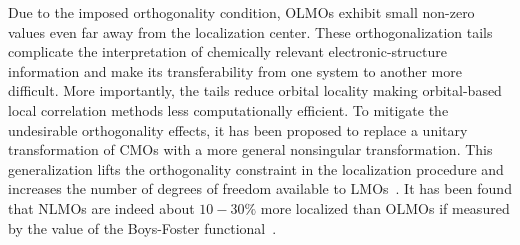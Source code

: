 \documentclass[aps,prl,reprint,amsmath,amssymb]{revtex4-1}
\begin{document}
Due to the imposed orthogonality condition, OLMOs exhibit small non-zero values even far away from the localization center. 
These orthogonalization tails complicate the interpretation of chemically relevant electronic-structure information and make its transferability from one system to another more difficult. More importantly, the tails reduce orbital locality making orbital-based local correlation methods less computationally efficient.
%
% 
To mitigate the undesirable orthogonality effects, it has been proposed to replace a unitary transformation of CMOs with a more general nonsingular transformation. This generalization lifts the orthogonality constraint in the localization procedure and increases the number of degrees of freedom available to LMOs~\cite{anderson1968self, diner1968fully, magnasco1974localized, payne1977hartree, mehler1977self, feng2004An_efficient, cui2010efficient}. %
It has been found that NLMOs are indeed about $10-30 \%$ more localized than OLMOs if measured by the value of the Boys-Foster functional~\cite{feng2004An_efficient, liu2000nonorthogonal}. %
\end{document}
